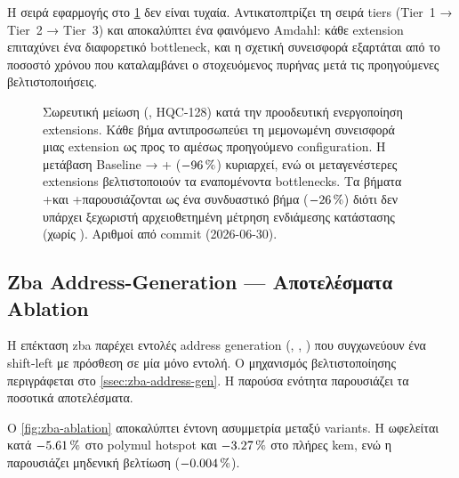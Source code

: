 Η σειρά εφαρμογής στο \cref{fig:waterfall-ablation} δεν είναι τυχαία.
Αντικατοπτρίζει τη σειρά tiers (Tier~1 → Tier~2 → Tier~3) και
αποκαλύπτει ένα φαινόμενο Amdahl: κάθε extension επιταχύνει ένα
διαφορετικό bottleneck, και η σχετική συνεισφορά εξαρτάται από το ποσοστό
χρόνου που καταλαμβάνει ο στοχευόμενος πυρήνας μετά τις προηγούμενες
βελτιστοποιήσεις.

\begin{figure}[htbp]
  \centering
  
  \caption{Σωρευτική μείωση \instret (\Decaps, HQC-128) κατά την
    προοδευτική ενεργοποίηση extensions. Κάθε βήμα αντιπροσωπεύει
    τη μεμονωμένη συνεισφορά μιας extension ως προς το αμέσως
    προηγούμενο configuration. Η μετάβαση Baseline → +\Zbc
    ($-\SI{96}{\percent}$) κυριαρχεί, ενώ οι μεταγενέστερες extensions
    βελτιστοποιούν τα εναπομένοντα bottlenecks. Τα βήματα
    +\Zvbc και +\Zvbb παρουσιάζονται ως ένα συνδυαστικό βήμα
    ($-\SI{26}{\percent}$) διότι δεν υπάρχει ξεχωριστή αρχειοθετημένη
    μέτρηση ενδιάμεσης κατάστασης (\Zvbc χωρίς \Zvbb).
    Αριθμοί από commit  (2026-06-30).}
  \label{fig:waterfall-ablation}
\end{figure}

\subsection{Zba Address-Generation — Αποτελέσματα Ablation}
\label{ssec:zba-ablation}


Η επέκταση \gls{zba} παρέχει εντολές address generation (,
, ) που συγχωνεύουν ένα shift-left με πρόσθεση
σε μία μόνο εντολή. Ο μηχανισμός βελτιστοποίησης περιγράφεται στο
\cref{ssec:zba-address-gen}. Η παρούσα ενότητα παρουσιάζει τα ποσοτικά
αποτελέσματα.

Ο \cref{fig:zba-ablation} αποκαλύπτει έντονη ασυμμετρία μεταξύ variants.
Η  ωφελείται κατά $-\SI{5.61}{\percent}$ στο polymul hotspot
και $-\SI{3.27}{\percent}$ στο πλήρες \gls{kem}, ενώ η  παρουσιάζει
μηδενική βελτίωση ($-\SI{0.004}{\percent}$).

